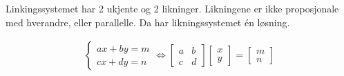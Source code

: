 \documentclass[11pt, a4paper, norsk]{NTNUoving}
\begin{document}
\begin{oppgave}[5]
    \begin{punkt}
        Linkingssystemet har 2 ukjente og 2 likninger. Likningene er ikke proposjonale med hverandre, eller parallelle. Da har likningssystemet én løsning. 
    \end{punkt}
    \begin{punkt}
        \begin{align*}
            \begin{cases}
            ax+by=m\\
            cx+dy=n
            \end{cases}
            \Leftrightarrow
            \begin{bmatrix} %
            a & b\\
            c & d
            \end{bmatrix}
            \begin{bmatrix}
            x\\y
            \end{bmatrix}
            =
            \begin{bmatrix}
            m\\
            n
            \end{bmatrix}
        \end{align*}
        

\end{punkt}
\end{oppgave}
\end{document}

